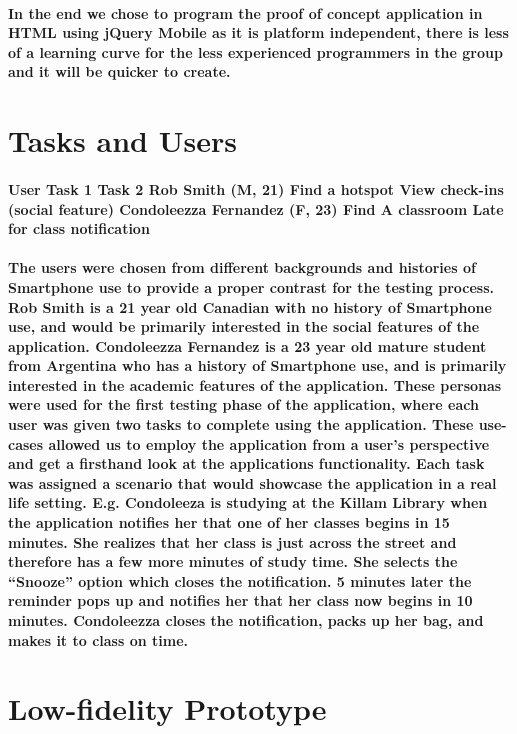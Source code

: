 \documentclass{report}
\begin{document}
    \paragraph{In the end we chose to program the proof of concept application
    in HTML using jQuery Mobile as it is platform independent, there is less of a
    learning curve for the less experienced programmers in the group and it will be
    quicker to create.}
\section{Tasks and Users}
    \paragraph{User Task 1 Task 2 Rob Smith (M, 21) Find a hotspot View
    check-ins (social feature) Condoleezza Fernandez (F, 23) Find A classroom Late
    for class notification}
    \paragraph{The users were chosen from different backgrounds and histories of
    Smartphone use to provide a proper contrast for the testing process. Rob Smith
    is a 21 year old Canadian with no history of Smartphone use, and would be
    primarily interested in the social features of the application. Condoleezza
    Fernandez is a 23 year old mature student from Argentina who has a history of
    Smartphone use, and is primarily interested in the academic features of the
    application. These personas were used for the first testing phase of the
    application, where each user was given two tasks to complete using the
    application. These use-cases allowed us to employ the application from a user’s
    perspective and get a firsthand look at the applications functionality. Each
    task was assigned a scenario that would showcase the application in a real life
    setting. E.g. Condoleeza is studying at the Killam Library when the application
    notifies her that one of her classes begins in 15 minutes. She realizes that her
    class is just across the street and therefore has a few more minutes of study
    time. She selects the “Snooze” option which closes the notification. 5 minutes
    later the reminder pops up and notifies her that her class now begins in 10
    minutes. Condoleezza closes the notification, packs up her bag, and makes it to
    class on time.}
\section{Low-fidelity Prototype}
\end{document}
